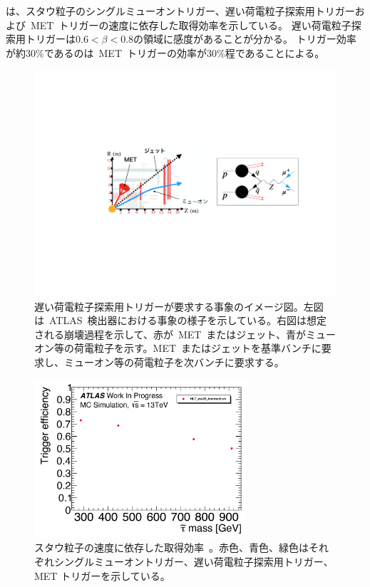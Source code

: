 は、スタウ粒子のシングルミューオントリガー、遅い荷電粒子探索用トリガーおよび~MET~トリガーの速度に依存した取得効率を示している。
遅い荷電粒子探索用トリガーは$0.6 < \beta < 0.8$の領域に感度があることが分かる。
トリガー効率が約$30\%$であるのは~MET~トリガーの効率が$30\%$程であることによる。

\begin{figure}[tbp]
        \centering   
        \includegraphics[width=\textwidth,page=1]{img/pdf3/met.pdf}
        \caption[遅い荷電粒子探索用トリガーが要求する事象のイメージ図]{遅い荷電粒子探索用トリガーが要求する事象のイメージ図。左図は~ATLAS~検出器における事象の様子を示している。右図は想定される崩壊過程を示して、赤が~MET~またはジェット、青がミューオン等の荷電粒子を示す。MET~またはジェットを基準バンチに要求し、ミューオン等の荷電粒子を次バンチに要求する。}
        \label{fig:met}
\end{figure}

\begin{figure}[tbp]
        \centering   
        \includegraphics[width=0.7\textwidth,page=3]{img/pdf3/sumi.pdf}
        \caption[スタウ粒子の速度に依存した取得効率]{スタウ粒子の速度に依存した取得効率~\cite{MT:01}。赤色、青色、緑色はそれぞれシングルミューオントリガー、遅い荷電粒子探索用トリガー、MET トリガーを示している。}
        \label{fig:sumi3}
\end{figure}

